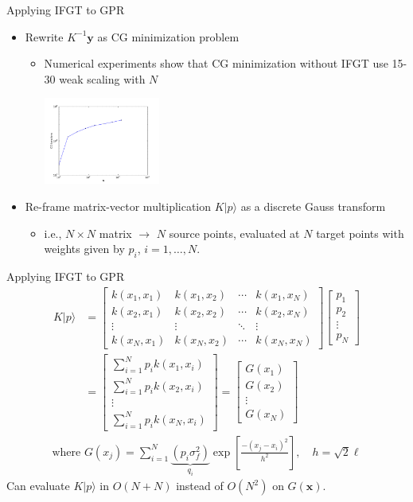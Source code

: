 \documentclass[xcolor=pdftex,dvipsnames,table]{beamer}
\newcommand{\eq}[1]{\begin{align*} #1 \end{align*}}
\let\vec\mathbf
\newcommand{\ket}[1]{\lvert #1 \rangle}
\begin{document}
\begin{frame}{Applying IFGT to GPR} 
  \begin{itemize}
    \item Rewrite $K^{-1}\vec{y}$ as CG minimization problem
      \begin{itemize}
        \item Numerical experiments show that CG minimization without IFGT use 15-30 weak scaling with $N$
        \begin{center}
          \includegraphics[width=1.5in]{cgtrend.pdf}
          \end{center}
      \end{itemize}
    \item Re-frame matrix-vector multiplication $K\ket{p}$ as a discrete Gauss transform
    \begin{itemize}
      \item i.e., $N\times N$ matrix $\to$ $N$ source points, evaluated at $N$ target points with weights given by $p_i$, $i=1,\dots,N$. 
    \end{itemize}
    \end{itemize}
\end{frame}
\begin{frame}{Applying IFGT to GPR}
\eq{K\ket{p} &= 
  \begin{bmatrix}
  k(x_1,x_1) & k(x_1, x_2) & \cdots & k(x_1,x_N) \\
  k(x_2,x_1) & k(x_2, x_2) & \cdots & k(x_2,x_N) \\
  \vdots & \vdots & \ddots & \vdots \\
  k(x_N,x_1) & k(x_N, x_2) & \cdots & k(x_N,x_N)
  \end{bmatrix}
\begin{bmatrix}p_1\\p_2\\\vdots\\p_N\end{bmatrix} \\
&= 
\begin{bmatrix}
\sum_{i=1}^N p_i k(x_1, x_i)\\
\sum_{i=1}^N p_i k(x_2, x_i)\\
\vdots \\
\sum_{i=1}^N p_i k(x_N, x_i)
\end{bmatrix} = \begin{bmatrix}
G(x_1) \\
G(x_2) \\
\vdots \\
G(x_N)
\end{bmatrix}}
\eq{\text{where } G(x_j) = \sum_{i=1}^N \underbrace{(p_i \sigma_f^2)}_{q_i} \exp\left[\frac{-(x_j-x_i)^2}{h^2}\right], \quad h = \sqrt{2}\ell}
Can evaluate $K\ket{p}$ in $O(N+N)$ instead of $O(N^2)$ on $G(\vec{x})$.
\end{frame} 
\end{document}
